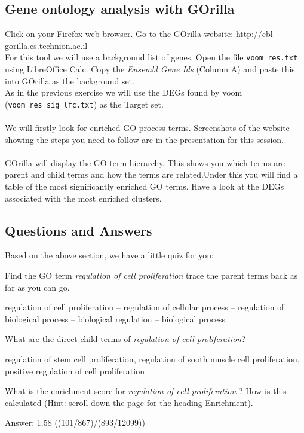 \subsection{Gene ontology analysis with GOrilla}

Click on your Firefox web browser.  Go to the GOrilla website: \url{http://cbl-gorilla.cs.technion.ac.il}\\
For this tool we will use a background list of genes. Open the file \texttt{voom\_res.txt} using LibreOffice Calc.  Copy the \emph{Ensembl Gene Ids} (Column A) and paste this into GOrilla as the background set.\\As in the previous exercise we will use the DEGs found by voom (\texttt{voom\_res\_sig\_lfc.txt}) as the Target set. \\\\
We will firstly look for enriched GO process terms.  Screenshots of the website showing the steps you need to follow are in the presentation for this session.\\\\GOrilla will display the GO term hierarchy. This shows you which terms are parent and child terms and how the terms are related.Under this you will find a table of the most significantly enriched GO terms.  Have a look at the DEGs associated with the most enriched clusters.

\subsection{Questions and Answers}
Based on the above section, we have a little quiz for you:
\begin{questions}
Find the GO term \emph{regulation of cell proliferation} trace the parent terms back as far as you can go. 
\begin{answer}
regulation of cell proliferation – regulation of cellular process – regulation of biological process – biological regulation – biological process
\end{answer}
What are the direct child terms of \emph{regulation of cell proliferation}?
\begin{answer}
regulation of stem cell proliferation, regulation of sooth muscle cell proliferation, positive regulation of cell proliferation
\end{answer}
What is the enrichment score for \emph{regulation of cell proliferation} ? How is this calculated (Hint: scroll down the page for the heading Enrichment). 
\begin{answer}
Answer: 1.58 ((101/867)/(893/12099))
\end{answer}
\end{questions}
